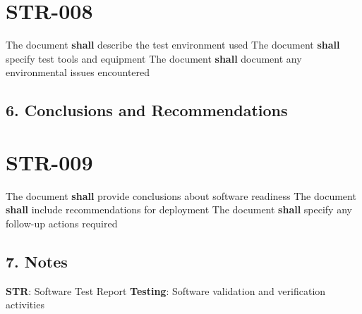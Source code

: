 \section{STR-008}\label{STR-008}

The document \textbf{shall} describe the test environment used
The document \textbf{shall} specify test tools and equipment
The document \textbf{shall} document any environmental issues encountered

\subsection{6. Conclusions and Recommendations}

\section{STR-009}\label{STR-009}

The document \textbf{shall} provide conclusions about software readiness
The document \textbf{shall} include recommendations for deployment
The document \textbf{shall} specify any follow-up actions required

\subsection{7. Notes}
\textbf{STR}: Software Test Report
\textbf{Testing}: Software validation and verification activities

